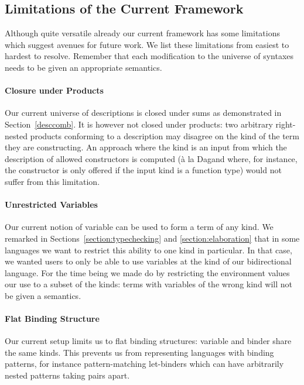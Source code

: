 {\subsection{Limitations of the Current Framework}

Although quite versatile already our current framework has some limitations
which suggest avenues for future work. We list these limitations from easiest
to hardest to resolve. Remember that each modification to the universe of
syntaxes needs to be given an appropriate semantics.

\paragraph{Closure under Products} Our current universe of descriptions is
closed under sums as demonstrated in Section~\ref{desccomb}. It is however
not closed under products: two arbitrary right-nested products conforming
to a description may disagree on the kind of the term they are constructing.
An approach where the kind is an input from which the description of allowed
constructors is computed (à la Dagand \citeyear{DBLP:phd/ethos/Dagand13} where,
for instance, the  constructor is only offered if the input kind is
a function type) would not suffer from this limitation.

\paragraph{Unrestricted Variables} Our current notion of variable can be used
to form a term of any kind. We remarked in Sections~\ref{section:typechecking}
and \ref{section:elaboration} that in some languages we want to restrict this
ability to one kind in particular. In that case, we wanted users to only be able
to use variables at the kind  of our bidirectional language. For the
time being we made do by restricting the environment values our 
use to a subset of the kinds: terms with variables of the wrong kind will not be
given a semantics.

\paragraph{Flat Binding Structure} Our current setup limits us to flat binding
structures: variable and binder share the same kinds. This prevents us from
representing languages with binding patterns, for instance pattern-matching
let-binders which can have arbitrarily nested patterns taking pairs apart.

}

